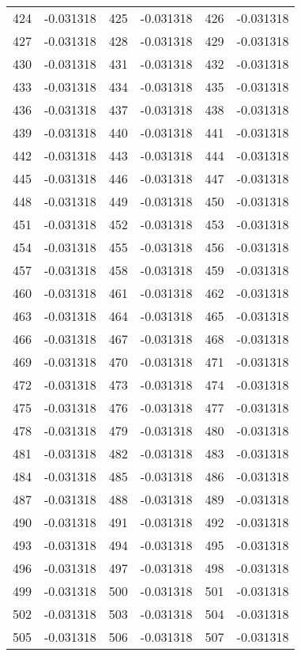 \documentclass[12pt]{article}
\begin{document}
\begin{longtable}{@{}cc|cc|cc@{}}
424 & -0.031318 & 425 & -0.031318 & 426 & -0.031318 \\
427 & -0.031318 & 428 & -0.031318 & 429 & -0.031318 \\
430 & -0.031318 & 431 & -0.031318 & 432 & -0.031318 \\
433 & -0.031318 & 434 & -0.031318 & 435 & -0.031318 \\
436 & -0.031318 & 437 & -0.031318 & 438 & -0.031318 \\
439 & -0.031318 & 440 & -0.031318 & 441 & -0.031318 \\
442 & -0.031318 & 443 & -0.031318 & 444 & -0.031318 \\
445 & -0.031318 & 446 & -0.031318 & 447 & -0.031318 \\
448 & -0.031318 & 449 & -0.031318 & 450 & -0.031318 \\
451 & -0.031318 & 452 & -0.031318 & 453 & -0.031318 \\
454 & -0.031318 & 455 & -0.031318 & 456 & -0.031318 \\
457 & -0.031318 & 458 & -0.031318 & 459 & -0.031318 \\
460 & -0.031318 & 461 & -0.031318 & 462 & -0.031318 \\
463 & -0.031318 & 464 & -0.031318 & 465 & -0.031318 \\
466 & -0.031318 & 467 & -0.031318 & 468 & -0.031318 \\
469 & -0.031318 & 470 & -0.031318 & 471 & -0.031318 \\
472 & -0.031318 & 473 & -0.031318 & 474 & -0.031318 \\
475 & -0.031318 & 476 & -0.031318 & 477 & -0.031318 \\
478 & -0.031318 & 479 & -0.031318 & 480 & -0.031318 \\
481 & -0.031318 & 482 & -0.031318 & 483 & -0.031318 \\
484 & -0.031318 & 485 & -0.031318 & 486 & -0.031318 \\
487 & -0.031318 & 488 & -0.031318 & 489 & -0.031318 \\
490 & -0.031318 & 491 & -0.031318 & 492 & -0.031318 \\
493 & -0.031318 & 494 & -0.031318 & 495 & -0.031318 \\
496 & -0.031318 & 497 & -0.031318 & 498 & -0.031318 \\
499 & -0.031318 & 500 & -0.031318 & 501 & -0.031318 \\
502 & -0.031318 & 503 & -0.031318 & 504 & -0.031318 \\
505 & -0.031318 & 506 & -0.031318 & 507 & -0.031318 \\

\end{longtable}
\end{document}
